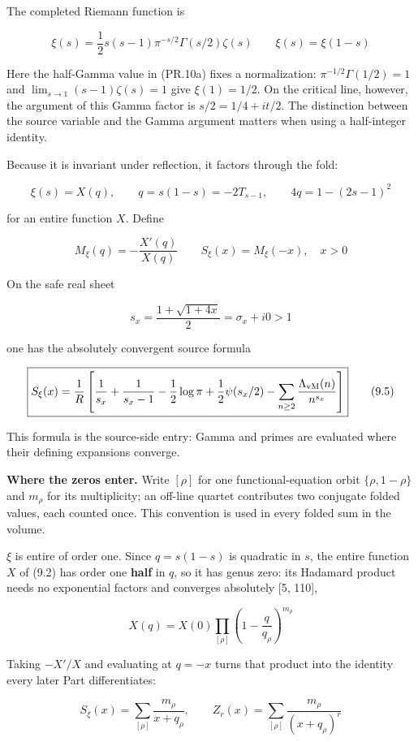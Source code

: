 \documentclass[
  11pt,
]{book}
\begin{document}
The completed Riemann function is

\[
\xi(s)=\frac12s(s-1)\pi^{-s/2}\Gamma(s/2)\zeta(s)
\qquad
\xi(s)=\xi(1-s)
\tag{9.1}
\]

Here the half-Gamma value in (PR.10a) fixes a normalization:
\(\pi^{-1/2}\Gamma(1/2)=1\) and \(\lim_{s\to1}(s-1)\zeta(s)=1\) give
\(\xi(1)=1/2\). On the critical line, however, the argument of this
Gamma factor is \(s/2=1/4+it/2\). The distinction between the source
variable and the Gamma argument matters when using a half-integer
identity.

Because it is invariant under reflection, it factors through the fold:

\[
\boxed{
\xi(s)=X(q),\qquad
q=s(1-s)=-2T_{s-1},\qquad
4q=1-(2s-1)^2}
\tag{9.2}
\]

for an entire function \(X\). Define

\[
M_\xi(q)=-\frac{X'(q)}{X(q)}
\qquad
S_\xi(x)=M_\xi(-x),\quad x>0
\tag{9.3}
\]

On the safe real sheet

\[
s_x=\frac{1+\sqrt{1+4x}}2=\sigma_x+i0>1
\tag{9.4}
\]

one has the absolutely convergent source formula

\[
\boxed{S_\xi(x)=\frac1R\left[
\frac1{s_x}+\frac1{s_x-1}-\frac12\log\pi
+\frac12\psi(s_x/2)
-\sum_{n\ge2}\frac{\Lambda_{\rm vM}(n)}{n^{s_x}}
\right]}
\tag{9.5}
\]

This formula is the source-side entry: Gamma and primes are evaluated
where their defining expansions converge.

\textbf{Where the zeros enter.} Write \([\rho]\) for one
functional-equation orbit \(\{\rho,1-\rho\}\) and \(m_\rho\) for its
multiplicity; an off-line quartet contributes two conjugate folded
values, each counted once. This convention is used in every folded sum
in the volume.

\(\xi\) is entire of order one. Since \(q=s(1-s)\) is quadratic in
\(s\), the entire function \(X\) of (9.2) has order one \textbf{half} in
\(q\), so it has genus zero: its Hadamard product needs no exponential
factors and converges absolutely {[}5, 110{]},

\[
X(q)=X(0)\prod_{[\rho]}\left(1-\frac{q}{q_\rho}\right)^{m_\rho}
\tag{9.6}
\]

Taking \(-X'/X\) and evaluating at \(q=-x\) turns that product into the
identity every later Part differentiates:

\[
\boxed{S_\xi(x)=\sum_{[\rho]}\frac{m_\rho}{x+q_\rho},
\qquad
Z_r(x)=\sum_{[\rho]}\frac{m_\rho}{(x+q_\rho)^{r}}}
\tag{9.7}
\]
\end{document}
